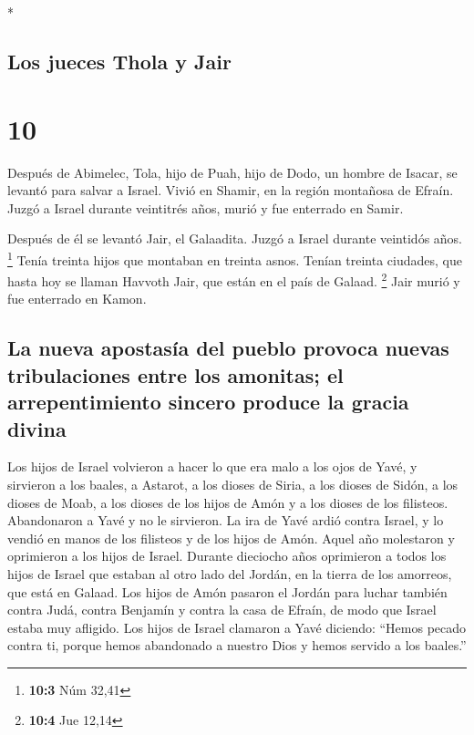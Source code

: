 \begin{paracol}{2}
\begin{otherlanguage}{english}
\end{otherlanguage}

\switchcolumn[0]*

\hypertarget{los-jueces-thola-y-jair}{%
\subsection{Los jueces Thola y Jair}\label{los-jueces-thola-y-jair}}

\hypertarget{section-18}{%
\section{10}\label{section-18}}

 Después de Abimelec, Tola, hijo de Puah, hijo de Dodo, un
hombre de Isacar, se levantó para salvar a Israel. Vivió en Shamir, en
la región montañosa de Efraín.  Juzgó a Israel durante
veintitrés años, murió y fue enterrado en Samir.

 Después de él se levantó Jair, el Galaadita. Juzgó a
Israel durante veintidós años. \footnote{\textbf{10:3} Núm 32,41}
 Tenía treinta hijos que montaban en treinta asnos. Tenían
treinta ciudades, que hasta hoy se llaman Havvoth Jair, que están en el
país de Galaad. \footnote{\textbf{10:4} Jue 12,14}  Jair
murió y fue enterrado en Kamon.

\hypertarget{la-nueva-apostasuxeda-del-pueblo-provoca-nuevas-tribulaciones-entre-los-amonitas-el-arrepentimiento-sincero-produce-la-gracia-divina}{%
\subsection{La nueva apostasía del pueblo provoca nuevas tribulaciones
entre los amonitas; el arrepentimiento sincero produce la gracia
divina}\label{la-nueva-apostasuxeda-del-pueblo-provoca-nuevas-tribulaciones-entre-los-amonitas-el-arrepentimiento-sincero-produce-la-gracia-divina}}

 Los hijos de Israel volvieron a hacer lo que era malo a
los ojos de Yavé, y sirvieron a los baales, a Astarot, a los dioses de
Siria, a los dioses de Sidón, a los dioses de Moab, a los dioses de los
hijos de Amón y a los dioses de los filisteos. Abandonaron a Yavé y no
le sirvieron.  La ira de Yavé ardió contra Israel, y lo
vendió en manos de los filisteos y de los hijos de Amón. 
Aquel año molestaron y oprimieron a los hijos de Israel. Durante
dieciocho años oprimieron a todos los hijos de Israel que estaban al
otro lado del Jordán, en la tierra de los amorreos, que está en Galaad.
 Los hijos de Amón pasaron el Jordán para luchar también
contra Judá, contra Benjamín y contra la casa de Efraín, de modo que
Israel estaba muy afligido.  Los hijos de Israel clamaron
a Yavé diciendo: ``Hemos pecado contra ti, porque hemos abandonado a
nuestro Dios y hemos servido a los baales.''


\end{paracol}
